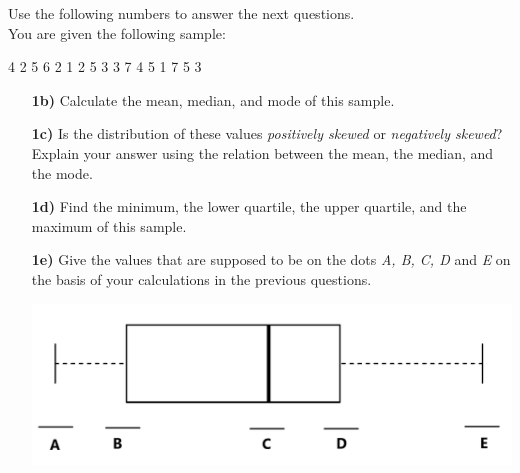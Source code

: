 Use the following numbers to answer the next questions. \\

You are given the following sample: \\
\begin{center}
    4 \hspace{.1cm} 2 \hspace{.1cm} 5 \hspace{.1cm} 6 \hspace{.1cm} 2 \hspace{.1cm} 1 \hspace{.1cm} 2 \hspace{.1cm} 5 \hspace{.1cm} 3 \hspace{.1cm} 3 \hspace{.1cm} 7 \hspace{.1cm} 4 \hspace{.1cm} 5 \hspace{.1cm} 1 \hspace{.1cm} 7 \hspace{.1cm} 5 \hspace{.1cm} 3
\end{center}

\begin{itemize}

\item[\textbf{1b)}] Calculate the mean, median, and mode of this sample.

\item[\textbf{1c)}] Is the distribution of these values \textit{positively skewed} or \textit{negatively skewed}? Explain your answer using the relation between the mean, the median, and the mode.

\item[\textbf{1d)}] Find the minimum, the lower quartile, the upper quartile, and the maximum of this sample. 

\item[\textbf{1e)}] Give the values that are supposed to be on the dots \textit{A, B, C, D} and \textit{E} on the basis of your calculations in the previous questions. \\
\begin{center}
    \includegraphics[width=.7\textwidth]{Files/Images/boxPlotExam.png}
\end{center}

\end{itemize}

